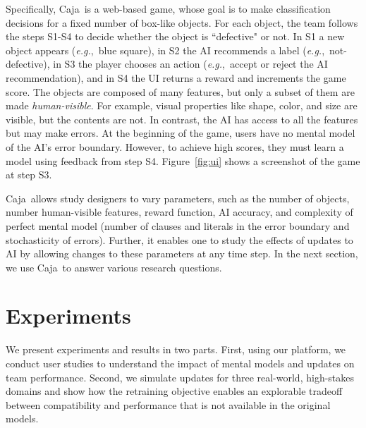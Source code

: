 \documentclass[letterpaper]{article}
\newcommand{\eg}{\mbox{\it e.g.}}
\newcommand{\plat}{{\sc Caja}}
\begin{document}
Specifically, \plat\ is a web-based game, whose goal is to make classification decisions for a fixed number of box-like objects.  For each object, the team follows the steps S1-S4 to decide whether the object is ``defective" or not. In S1 a new object appears (\eg,\ blue square), in S2 the AI recommends a label (\eg,\ not-defective), in S3 the player chooses an action (\eg,\ accept or reject the AI recommendation), and in S4 the UI returns a reward and increments the game score. The objects are composed of many features, but only a subset of them are made {\em human-visible}.
For example, visual properties like shape, color, and size are visible, but the contents are not. In contrast, the AI has access to all the features but 
may make errors. At the beginning of the game, users have no mental model of the AI's error boundary. However, to achieve high scores, they must learn a model using feedback from step S4. Figure~\ref{fig:ui} shows a screenshot of the game at step S3. %

\plat\ allows study designers to vary parameters, such as the number of objects, number human-visible features, reward function, AI accuracy, and complexity of perfect mental model (number of clauses and literals in the   error boundary and stochasticity of errors). Further, it enables one to study the effects of updates to AI by allowing changes to these parameters at any time step. In the next section, we use \plat\ to answer various research questions.


\section{Experiments}
We present experiments and results in two parts. First, using our platform, we conduct user studies to understand the impact of mental models and updates on team performance. Second, we simulate updates for three real-world, high-stakes domains and show how the retraining objective enables an explorable tradeoff between compatibility and performance that is not available in the original models.
\end{document}
